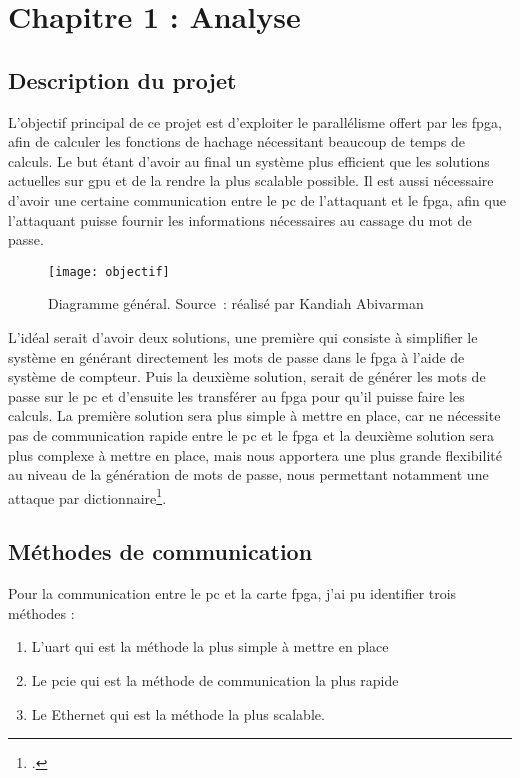 \chapter{Chapitre 1 : Analyse}

\section{Description du projet}
L'objectif principal de ce projet est d'exploiter le parallélisme offert par les \gls{fpga}, afin de calculer les fonctions de hachage nécessitant beaucoup de temps de calculs. 
Le but étant d'avoir au final un système plus efficient que les solutions actuelles sur \gls{gpu} et de la rendre la plus scalable possible.
Il est aussi nécessaire d'avoir une certaine communication entre le \gls{pc} de l'attaquant et le \gls{fpga}, afin que l'attaquant puisse fournir les informations nécessaires au cassage du mot de passe.

\begin{figure}[tbph!]
	\centering
	\texttt{[image: objectif]}
	\caption[Diagramme général]{Diagramme général. Source : réalisé par Kandiah Abivarman}
	\label{fig:objectif}
\end{figure}

L'idéal serait d'avoir deux solutions, une première qui consiste à simplifier le système en générant directement les mots de passe dans le \gls{fpga} à l'aide de système de compteur.
Puis la deuxième solution, serait de générer les mots de passe sur le \gls{pc} et d'ensuite les transférer au \gls{fpga} pour qu'il puisse faire les calculs.
La première solution sera plus simple à mettre en place, car ne nécessite pas de communication rapide entre le \gls{pc} et le \gls{fpga}
et la deuxième solution sera plus complexe à mettre en place, mais nous apportera une plus grande flexibilité au niveau de la génération de mots de passe, nous permettant notamment une attaque par dictionnaire\footcite{noauthor_attaque_2021}.

\section{Méthodes de communication}

Pour la communication entre le \gls{pc} et la carte \gls{fpga}, j'ai pu identifier trois méthodes :
\begin{enumerate}
	\item L'\gls{uart} qui est la méthode la plus simple à mettre en place
	\item Le \gls{pcie} qui est la méthode de communication la plus rapide
	\item Le Ethernet qui est la méthode la plus scalable.
\end{enumerate}

